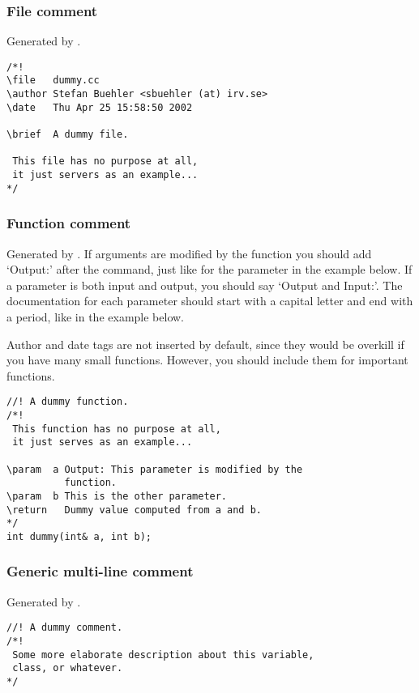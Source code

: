 \subsubsection{File comment}

Generated by .

\begin{verbatim}
/*!
\file   dummy.cc
\author Stefan Buehler <sbuehler (at) irv.se>
\date   Thu Apr 25 15:58:50 2002

\brief  A dummy file.

 This file has no purpose at all,
 it just servers as an example... 
*/
\end{verbatim}

\subsubsection{Function comment}

Generated by .
If arguments are modified by the function you should
add `Output:' after the \artsstyle{\\param} command, just like for the
parameter  in the example below. If a parameter is both input
and output, you should say `Output and Input:'. The documentation for
each parameter should start with a capital letter and end with a
period, like in the example below.

Author and date tags are not inserted by default, since they would be
overkill if you have many small functions. However, you should include
them for important functions. 

\begin{verbatim}
//! A dummy function.
/*! 
 This function has no purpose at all,
 it just serves as an example... 

\param  a Output: This parameter is modified by the
          function.
\param  b This is the other parameter.         
\return   Dummy value computed from a and b.         
*/
int dummy(int& a, int b);
\end{verbatim}

\subsubsection{Generic multi-line comment}

Generated by .

\begin{verbatim}
//! A dummy comment.
/*! 
 Some more elaborate description about this variable, 
 class, or whatever. 
*/
\end{verbatim}

